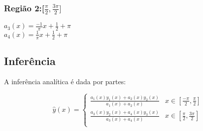 \documentclass{article}
\begin{document}
\subsubsection*{Região 2:[$\frac{\pi}{2}, \frac{3\pi}{2}]$}

$a_3(x) = \frac{-1}{\pi}x + \frac{1}{2} + \pi$ \\
$a_4(x) = \frac{1}{\pi}x + \frac{1}{2} + \pi$ \\

\subsection*{Inferência}

A inferência analítica é dada por partes:

\[ 
    \hat{y}(x) =
    \begin{cases}
    \frac{a_{1}(x)y_{1}(x) + a_{2}(x)y_{2}(x)}{a_{1}(x)+a_{2}(x)} & x \in [\frac{-\pi}{2}, \frac{\pi}{2}]\\
    \frac{a_{3}(x)y_{2}(x) + a_{4}(x)y_{3}(x)}{a_{3}(x)+a_{4}(x)} & x \in [\frac{\pi}{2}, \frac{3\pi}{2}] \\
   \end{cases}
\]
\end{document}
